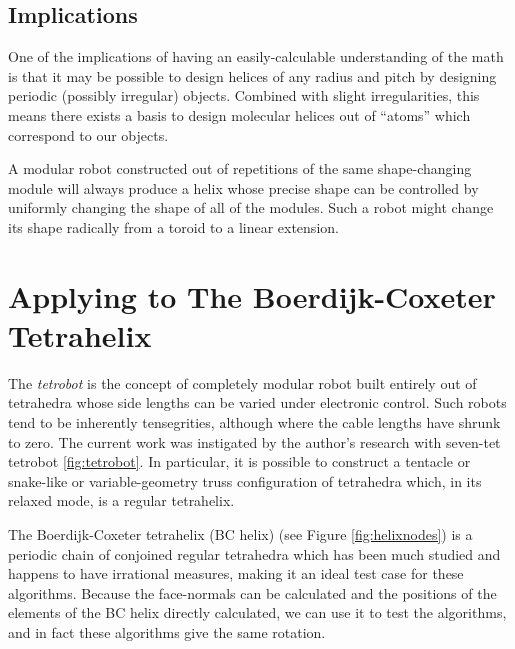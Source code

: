 \documentclass{svproc}
\begin{document}
\subsection{Implications}

One of the implications of having an easily-calculable understanding of the math
is that it may be possible to design helices
of any radius and pitch by designing periodic (possibly irregular) objects.
Combined with slight
irregularities, this means there exists a basis to design molecular helices
out of ``atoms'' which correspond to our objects.

A modular robot constructed out of repetitions of the same
shape-changing module will always
produce a helix
whose precise shape can be controlled by uniformly changing the shape of all
of the modules. Such a robot might change its shape radically from a toroid
to a linear extension.

\section{Applying to The Boerdijk-Coxeter Tetrahelix}






The {\em tetrobot}\cite{sanderson1996modular,HamlinSandersonCMS,lee1999dynamics,TetrobotBook,} is the concept of completely
modular robot built entirely out of tetrahedra whose side lengths can
be varied under electronic control. Such robots tend to be inherently
tensegrities\cite{mirletz2014,NTRT,paul2006}, although where the cable lengths
have shrunk to zero.
The current work was instigated by the author's research with seven-tet tetrobot
\ref{fig:tetrobot}.
In particular, it is possible to construct a tentacle or snake-like or
variable-geometry truss configuration of tetrahedra which, in its relaxed
mode, is a regular tetrahelix.

The Boerdijk-Coxeter tetrahelix (BC helix) (see Figure \ref{fig:helixnodes}) is a periodic chain of conjoined regular tetrahedra
which has been much studied\cite{coxeter1985simplicial,sadler2019periodic,fuller1982synergetics,read2018transforming}
and happens to have irrational measures, making it an ideal
test case for these algorithms. Because the face-normals can be calculated and the
positions of the elements of the BC helix directly calculated, we can use
it to test the algorithms, and in fact these algorithms give the same rotation.
\end{document}
